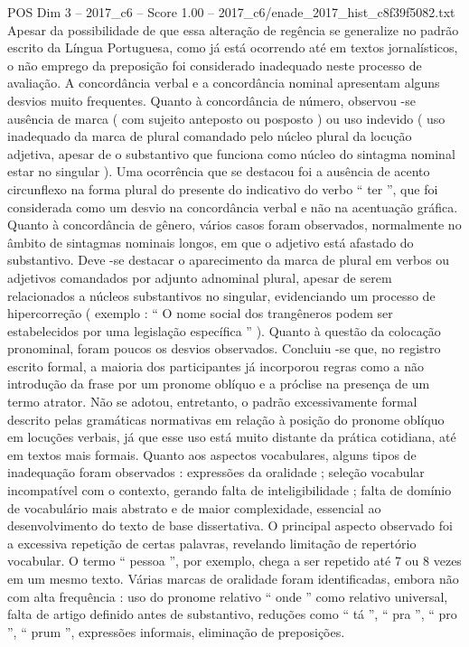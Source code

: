 \begin{textsample}{POS Dim 3 – 2017\_c6 – Score 1.00 – 2017\_c6/enade\_2017\_hist\_c8f39f5082.txt}
Apesar da possibilidade de que essa alteração de regência se generalize no padrão escrito da Língua Portuguesa, como já está ocorrendo até em textos jornalísticos, o não emprego da preposição foi considerado inadequado neste processo de avaliação.
A concordância verbal e a concordância nominal apresentam alguns desvios muito frequentes.
Quanto à concordância de número, observou -se ausência de marca ( com sujeito anteposto ou posposto ) ou uso indevido ( uso inadequado da marca de plural comandado pelo núcleo plural da locução adjetiva, apesar de o substantivo que funciona como núcleo do sintagma nominal estar no singular ).
Uma ocorrência que se destacou foi a ausência de acento circunflexo na forma plural do presente do indicativo do verbo “ ter ”, que foi considerada como um desvio na concordância verbal e não na acentuação gráfica.
Quanto à concordância de gênero, vários casos foram observados, normalmente no âmbito de sintagmas nominais longos, em que o adjetivo está afastado do substantivo.
Deve -se destacar o aparecimento da marca de plural em verbos ou adjetivos comandados por adjunto adnominal plural, apesar de serem relacionados a núcleos substantivos no singular, evidenciando um processo de hipercorreção ( exemplo : “ O nome social dos trangêneros podem ser estabelecidos por uma legislação específica ” ).
Quanto à questão da colocação pronominal, foram poucos os desvios observados.
Concluiu -se que, no registro escrito formal, a maioria dos participantes já incorporou regras como a não introdução da frase por um pronome oblíquo e a próclise na presença de um termo atrator.
Não se adotou, entretanto, o padrão excessivamente formal descrito pelas gramáticas normativas em relação à posição do pronome oblíquo em locuções verbais, já que esse uso está muito distante da prática cotidiana, até em textos mais formais.
Quanto aos aspectos vocabulares, alguns tipos de inadequação foram observados : expressões da oralidade ; seleção vocabular incompatível com o contexto, gerando falta de inteligibilidade ; falta de domínio de vocabulário mais abstrato e de maior complexidade, essencial ao desenvolvimento do texto de base dissertativa.
O principal aspecto observado foi a excessiva repetição de certas palavras, revelando limitação de repertório vocabular.
O termo “ pessoa ”, por exemplo, chega a ser repetido até 7 ou 8 vezes em um mesmo texto.
Várias marcas de oralidade foram identificadas, embora não com alta frequência : uso do pronome relativo “ onde ” como relativo universal, falta de artigo definido antes de substantivo, reduções como “ tá ”, “ pra ”, “ pro ”, “ prum ”, expressões informais, eliminação de preposições.

\end{textsample}
